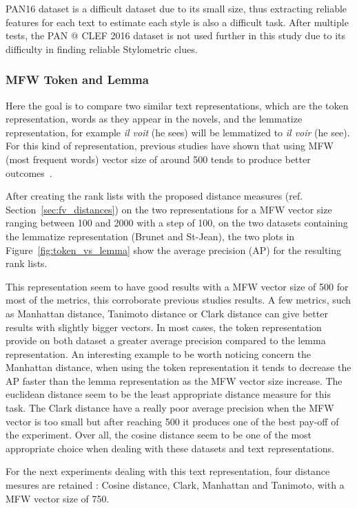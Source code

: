 PAN16 dataset is a difficult dataset due to its small size, thus extracting reliable features for each text to estimate each style is also a difficult task.
After multiple tests, the PAN @ CLEF 2016 dataset is not used further in this study due to its difficulty in finding reliable Stylometric clues.

\subsubsection{MFW Token and Lemma}
\label{sec:mfw_token_lemma}

Here the goal is to compare two similar text representations, which are the token representation, words as they appear in the novels, and the lemmatize representation, for example \textit{il voit} (he sees) will be lemmatized to \textit{il voir} (he see).
For this kind of representation, previous studies have shown that using MFW (most frequent words) vector size of around 500 tends to produce better outcomes~\cite{savoy_text_representation}.

After creating the rank lists with the proposed distance measures (ref. Section~\ref{sec:fv_distances}) on the two representations for a MFW vector size ranging between 100 and 2000 with a step of 100, on the two datasets containing the lemmatize representation (Brunet and St-Jean), the two plots in Figure~\ref{fig:token_vs_lemma} show the average precision (AP) for the resulting rank lists.

This representation seem to have good results with a MFW vector size of 500 for most of the metrics, this corroborate previous studies results.
A few metrics, such as Manhattan distance, Tanimoto distance or Clark distance can give better results with slightly bigger vectors.
In most cases, the token representation provide on both dataset a greater average precision compared to the lemma representation.
An interesting example to be worth noticing concern the Manhattan distance, when using the token representation it tends to decrease the AP faster than the lemma representation as the MFW vector size increase.
The euclidean distance seem to be the least appropriate distance measure for this task.
The Clark distance have a really poor average precision when the MFW vector is too small but after reaching 500 it produces one of the best pay-off of the experiment.
Over all, the cosine distance seem to be one of the most appropriate choice when dealing with these datasets and text representations.

For the next experiments dealing with this text representation, four distance mesures are retained : Cosine distance, Clark, Manhattan and Tanimoto, with a MFW vector size of 750.

